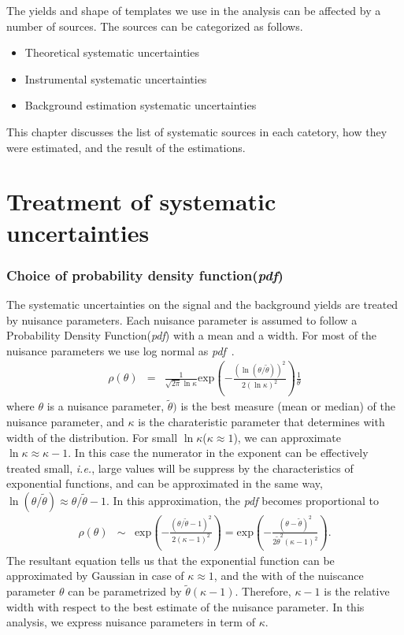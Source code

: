 
The yields and shape of templates we use in the analysis can be affected by a number of sources. 
The sources can be categorized as follows. 
\begin{itemize} 
\item Theoretical systematic uncertainties  
\item Instrumental systematic uncertainties  
\item Background estimation systematic uncertainties  
\end{itemize}  
This chapter discusses the list of systematic sources in each catetory, 
how they were estimated, and the result of the estimations. 


\section{Treatment of systematic uncertainties}
 
\subsubsection{Choice of probability density function(\textit{pdf})}
The systematic uncertainties on the signal and the background yields are 
treated by nuisance parameters. Each nuisance parameter is assumed to follow 
a Probability Density Function(\textit{pdf}) with a mean and a width.
For most of the nuisance parameters we use log normal as \textit{pdf}~\cite{}.
\begin{eqnarray} 
\rho(\theta) 
&=& 
\frac{1}{\sqrt{2\pi}\ln\kappa}  
\textrm{exp} \left( - \frac{\left( \ln(\theta/\tilde{\theta})\right)^2}
                           {2(\ln\kappa)^2}  \right) 
\frac{1}{\theta}  
\end{eqnarray} 
where $\theta$ is a nuisance parameter, $\tilde{\theta})$ is the best measure 
(mean or median) of the nuisance parameter, and $\kappa$ is the charateristic 
parameter that determines with width of the distribution. 
For small $\ln\kappa$($\kappa \approx 1$), we can approximate $\ln\kappa \approx \kappa - 1$.
In this case the numerator in the exponent can be effectively treated small,
\textit{i.e.}, large values will be suppress by the characteristics of exponential functions,  
and can be approximated in the same way, $\ln (\theta/\tilde{\theta}) \approx \theta/\tilde{\theta} - 1$.
In this approximation, the \textit{pdf} becomes proportional to 
\begin{eqnarray} 
\rho(\theta) 
&\sim&
\textrm{exp} \left( - \frac{\left( \theta/\tilde{\theta} - 1 \right)^2}
                           {2( \kappa - 1)^2}  \right)  
= 
\textrm{exp} \left( - \frac{\left( \theta - \tilde{\theta} \right)^2}
                           {2\tilde{\theta}^2 ( \kappa - 1)^2}  \right).  
\end{eqnarray} 
The resultant equation tells us that the exponential function can be 
approximated by Gaussian in case of $\kappa \approx 1$, and the with 
of the nuiscance parameter $\theta$ can be parametrized by $\tilde{\theta}( \kappa - 1)$.
Therefore, $\kappa - 1$ is the relative width with respect to the best 
estimate of the nuisance parameter. In this analysis, we express nuisance parameters 
in term of $\kappa$.

